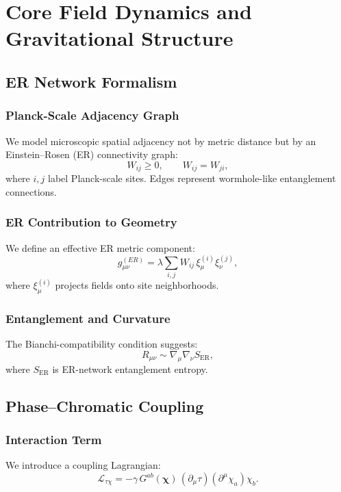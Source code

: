 

\part{Core Field Dynamics and Gravitational Structure}

\chapter{ER Network Formalism}

\section{Planck-Scale Adjacency Graph}

We model microscopic spatial adjacency not by metric distance but by 
an Einstein--Rosen (ER) connectivity graph:
\[
W_{ij} \ge 0,\qquad W_{ij}=W_{ji},
\]
where $i,j$ label Planck-scale sites.  
Edges represent wormhole-like entanglement connections.

\section{ER Contribution to Geometry}

We define an effective ER metric component:
\[
g^{(ER)}_{\mu\nu} = \lambda 
\sum_{i,j} W_{ij}\, \xi^{(i)}_\mu \xi^{(j)}_\nu,
\]
where $\xi^{(i)}_\mu$ projects fields onto site neighborhoods.

\section{Entanglement and Curvature}

The Bianchi-compatibility condition suggests:
\[
R_{\mu\nu} \sim \nabla_\mu\nabla_\nu S_{\mathrm{ER}},
\]
where $S_{\mathrm{ER}}$ is ER-network entanglement entropy.


\chapter{Phase--Chromatic Coupling}

\section{Interaction Term}

We introduce a coupling Lagrangian:
\[
\mathcal{L}_{\tau\chi}
=
-\gamma\,
G^{ab}(\bm{\chi})\, 
(\partial_\mu \tau)(\partial^\mu \chi_a)\chi_b .
\]


